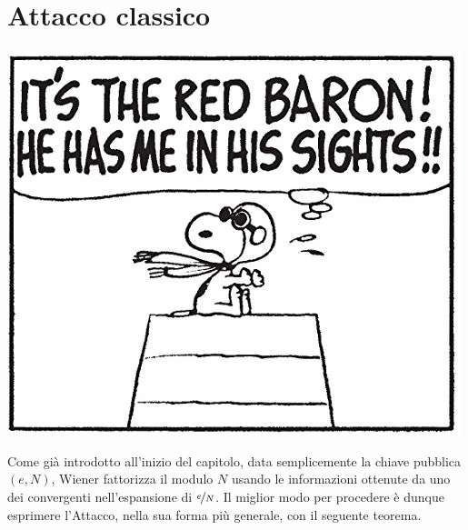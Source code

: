 \documentclass[twoside,symmetric,justified,openany,nobib]{tufte-book}
\begin{document}
\section*{\normalfont\textbf{Attacco classico}} %
\begin{marginfigure}[120pt] %
  \center
  \includegraphics[width=\textwidth]{red_baron1.png}
\end{marginfigure}
Come già introdotto all'inizio del capitolo, data semplicemente la chiave pubblica $(e,N)$, Wiener fattorizza il modulo $N$ usando le informazioni ottenute da uno dei convergenti nell'espansione di $\nicefrac{e}{N}$. Il miglior modo per procedere è dunque esprimere l'Attacco, nella sua forma più generale, con il seguente teorema.
\end{document}
